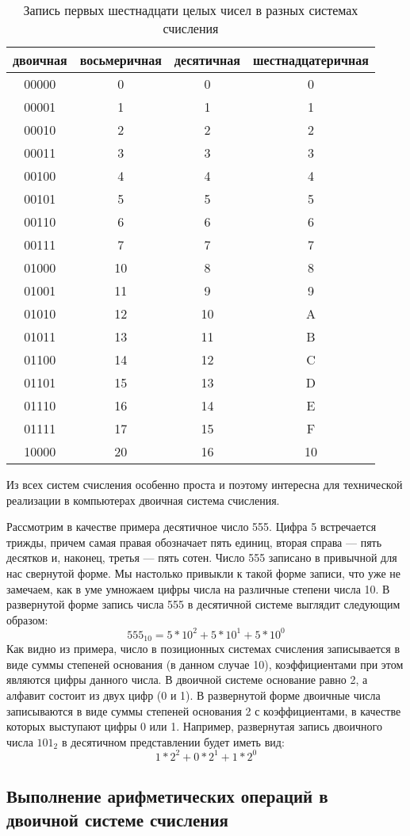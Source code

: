 \documentclass[a4paper]{article}
\begin{document}
\begin{table}
  \label{nums}
      \caption{Запись первых шестнадцати целых чисел в разных системах счисления}
      \begin{center}
      \begin{tabular}{|c|c|c|c|}
        \hline
        двоичная & восьмеричная & десятичная & шестнадцатеричная \\
        \hline
        00000 & 0 & 0 & 0 \\
        00001 & 1 & 1 & 1 \\
        00010 & 2 & 2 & 2 \\
        00011 & 3 & 3 & 3 \\
        00100 & 4 & 4 & 4 \\
        00101 & 5 & 5 & 5 \\
        00110 & 6 & 6 & 6 \\
        00111 & 7 & 7 & 7 \\
        01000 & 10 & 8 & 8 \\
        01001 & 11 & 9 & 9 \\
        01010 & 12 & 10 & A \\
        01011 & 13 & 11 & B \\
        01100 & 14 & 12 & C \\
        01101 & 15 & 13 & D \\
        01110 & 16 & 14 & E \\
        01111 & 17 & 15 & F \\
        10000 & 20 & 16 & 10 \\
        \hline
      \end{tabular}
      \end{center}
    \end{table}

Из всех систем счисления особенно проста и поэтому интересна для технической реализации в компьютерах двоичная система счисления.

Рассмотрим в качестве примера десятичное число 555. Цифра 5 встречается трижды, причем самая правая обозначает пять единиц, вторая справа — пять десятков и, наконец, третья — пять сотен. Число 555 записано в привычной для нас свернутой форме. Мы настолько привыкли к такой форме записи, что уже не замечаем, как в уме умножаем цифры числа на различные степени числа 10. В развернутой форме запись числа 555 в десятичной системе выглядит следующим образом:
$$555_{10} = 5 * 10^{2} + 5 * 10^{1} + 5 * 10^{0}$$
Как видно из примера, число в позиционных системах счисления записывается в виде суммы степеней основания (в данном случае 10), коэффициентами при этом являются цифры данного числа. В двоичной системе основание равно 2, а алфавит состоит из двух цифр (0 и 1). В развернутой форме двоичные числа записываются в виде суммы степеней основания 2 с коэффициентами, в качестве которых выступают цифры 0 или 1. Например, развернутая запись двоичного числа $101_{2}$ в десятичном представлении будет иметь вид:
$$1 * 2^{2} + 0 * 2^{1} + 1 * 2^{0}$$

\subsection{Выполнение арифметических операций в двоичной системе счисления}
\end{document}
